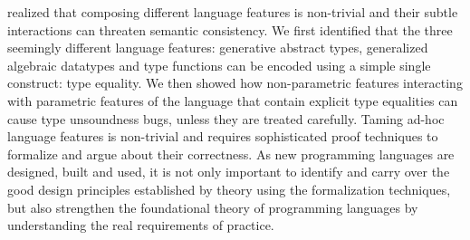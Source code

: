 \documentclass[screen,nonacm]{acmart}
\begin{document}
realized that composing different language features is non-trivial and
their subtle interactions can threaten semantic consistency. We
first identified that the three seemingly different language features:
generative abstract types, generalized algebraic datatypes and type
functions can be encoded using a simple single construct: type
equality. We then showed how non-parametric features
interacting with parametric features of the language that contain
explicit type equalities can cause type unsoundness bugs, unless they are
treated carefully. Taming ad-hoc language features is non-trivial and requires
sophisticated proof techniques to formalize and argue about their
correctness. As new programming languages are designed, built and
used, it is not only important to identify and carry over the good design principles
established by theory using the formalization techniques, but also
strengthen the foundational theory of programming languages
by understanding the real requirements of practice.

\end{document}
